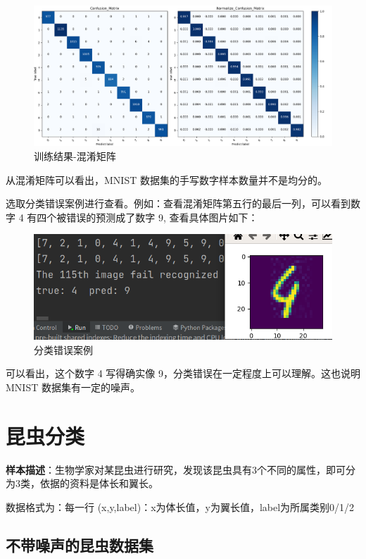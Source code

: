 \documentclass[12pt]{article}
\begin{document}
	\begin{figure}[H]
		\centering
		\includegraphics[width=5.5in]{./images/mnist_confusion.png}
		\centering
		\caption{训练结果-混淆矩阵}
	\end{figure}
	
	从混淆矩阵可以看出，MNIST 数据集的手写数字样本数量并不是均分的。
	
	选取分类错误案例进行查看。例如：查看混淆矩阵第五行的最后一列，可以看到数字 4 有四个被错误的预测成了数字 9, 查看具体图片如下：
	
	\begin{figure}[H]
		\centering
		\includegraphics[width=5in]{./images/fail_ex.png}
		\centering
		\caption{分类错误案例}
	\end{figure}
	
	可以看出，这个数字 4 写得确实像 9，分类错误在一定程度上可以理解。这也说明 MNIST 数据集有一定的噪声。
	
	
	\section{昆虫分类}
	
	\textbf{样本描述}：生物学家对某昆虫进行研究，发现该昆虫具有3个不同的属性，即可分为3类，依据的资料是体长和翼长。
	
	数据格式为：每一行 (x,y,label)：x为体长值，y为翼长值，label为所属类别0/1/2

	
	\subsection{不带噪声的昆虫数据集}
	
\end{document}
